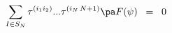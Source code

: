 \begin{equation}
\sum_{I \in S_N}
\tau^{( i_1 i_2 )} ... \tau^{( i_N \, N+1)} \pa F( \psi ) \;\;
=\;\; 0
\label{eq:3.7}
\end{equation}

